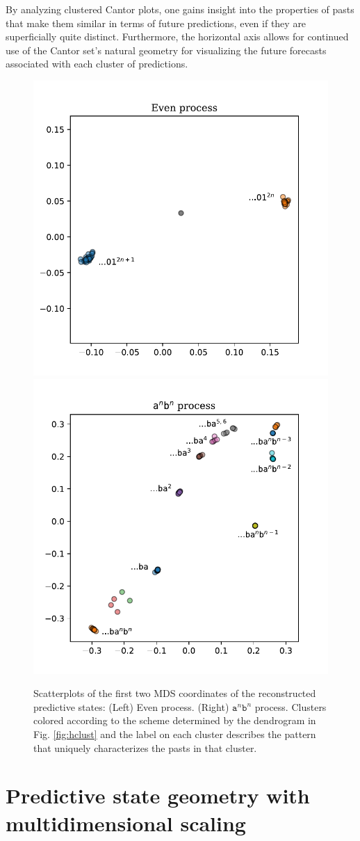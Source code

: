 \documentclass[draft,aps,pre,twocolumn,groupaddress,showkeys,nofootinbib,preprintnumbers,floatfix]{revtex4-2}
\begin{document}
By analyzing clustered Cantor plots, one gains insight into the properties of
pasts that make them similar in terms of future predictions, even if they are
superficially quite distinct. Furthermore, the horizontal axis allows for
continued use of the Cantor set's natural geometry for visualizing the future
forecasts associated with each cluster of predictions.

\begin{figure}[ht]
\centering
\includegraphics[width=0.49\linewidth]{../plots/even_MDS.pdf}
\includegraphics[width=0.48\linewidth]{../plots/anbn_MDS.pdf}
\caption{Scatterplots of the first two MDS coordinates of the reconstructed
	predictive states: (Left) Even process. (Right) $\mathtt{a}^n\mathtt{b}^n$
	process. Clusters colored according to the scheme determined by the
	dendrogram in Fig. \ref{fig:hclust} and the label on each cluster describes
	the pattern that uniquely characterizes the pasts in that cluster.
	}
\label{fig:mds}
\end{figure}

\section{Predictive state geometry with multidimensional scaling}
\end{document}
